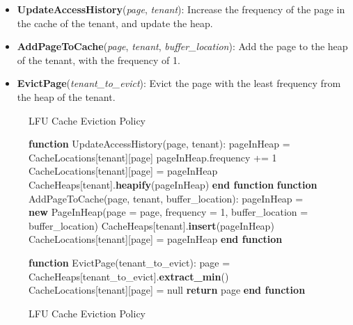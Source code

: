 \begin{itemize}
    \item \textbf{UpdateAccessHistory}(\textit{page}, \textit{tenant}): Increase the frequency of the page in the cache of the tenant, and update the heap.
    \item \textbf{AddPageToCache}(\textit{page}, \textit{tenant}, \textit{buffer\_location}): Add the page to the heap of the tenant, with the frequency of 1.
    \item \textbf{EvictPage}(\textit{tenant\_to\_evict}): Evict the page with the least frequency from the heap of the tenant.
\end{itemize}

\begin{figure}[htbp]
    \centering
    \begin{minipage}{\linewidth}
    \begin{algorithm}[H]
        \caption{LFU Cache Eviction Policy}
        \begin{algorithmic}
            \STATE \textbf{function} UpdateAccessHistory(page, tenant):
            \STATE \hspace{\algorithmicindent} pageInHeap = CacheLocations[tenant][page]
            \STATE \hspace{\algorithmicindent} pageInHeap.frequency += 1
            \STATE \hspace{\algorithmicindent} CacheLocations[tenant][page] = pageInHeap
            \STATE \hspace{\algorithmicindent} CacheHeaps[tenant].\textbf{heapify}(pageInHeap)
            \STATE \textbf{end function}
            \STATE
            \STATE \textbf{function} AddPageToCache(page, tenant, buffer\_location):
            \STATE \hspace{\algorithmicindent} pageInHeap = \textbf{new} PageInHeap(page = page, frequency = 1, buffer\_location = buffer\_location)
            \STATE \hspace{\algorithmicindent} CacheHeaps[tenant].\textbf{insert}(pageInHeap)
            \STATE \hspace{\algorithmicindent} CacheLocations[tenant][page] = pageInHeap
            \STATE \textbf{end function}

            \STATE
            \STATE \textbf{function} EvictPage(tenant\_to\_evict):
            \STATE \hspace{\algorithmicindent} page = CacheHeaps[tenant\_to\_evict].\textbf{extract\_min}()
            \STATE \hspace{\algorithmicindent} CacheLocations[tenant][page] = null
            \STATE \hspace{\algorithmicindent} \textbf{return} page
            \STATE \textbf{end function}
        \end{algorithmic}
    \end{algorithm}
    \caption{LFU Cache Eviction Policy}
    \label{fig:lfu}
    \end{minipage}
\end{figure}

